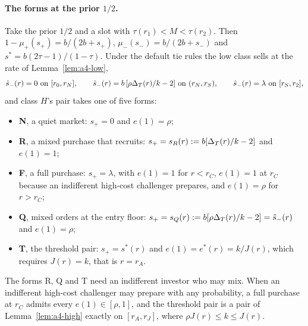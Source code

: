 \paragraph{The forms at the prior \(1/2\).}
Take the prior \(1/2\) and a slot with \(\tau(r_1)<M<\tau(r_2)\). Then \(1-\mu_+(s_+)=b/(2b+s_+)\),
\(\mu_-(s_-)=b/(2b+s_-)\) and \(s^*=b(2\tau-1)/(1-\tau)\). Under the default tie rules the low class sells at the rate
of Lemma~\ref{lem:a4-low},
\[
\hat s_-(r)=0\ \text{on}\ [r_0,r_N],\qquad \hat s_-(r)=b\,[\rho\Delta_T(r)/k-2]\ \text{on}\ (r_N,r_S),\qquad
\hat s_-(r)=\lambda\ \text{on}\ [r_S,r_2],
\]
and class \(H\)'s pair takes one of five forms:
\begin{itemize}[leftmargin=2em]
\item \textbf{N}, a quiet market: \(s_+=0\) and \(e(1)=\rho\);
\item \textbf{R}, a mixed purchase that recruits: \(s_+=s_R(r):=b[\Delta_T(r)/k-2]\) and \(e(1)=1\);
\item \textbf{F}, a full purchase: \(s_+=\lambda\), with \(e(1)=1\) for \(r<r_C\), \(e(1)=1\) at \(r_C\) because an
indifferent high-cost challenger prepares, and \(e(1)=\rho\) for \(r>r_C\);
\item \textbf{Q}, mixed orders at the entry floor: \(s_+=s_Q(r):=b[\rho\Delta_T(r)/k-2]=\hat s_-(r)\) and \(e(1)=\rho\);
\item \textbf{T}, the threshold pair: \(s_+=s^*(r)\) and \(e(1)=e^*(r)=k/J(r)\), which requires \(J(r)=k\), that is
\(r=r_A\).
\end{itemize}
The forms R, Q and T need an indifferent investor who may mix. When an indifferent high-cost challenger may prepare
with any probability, a full purchase at \(r_C\) admits every \(e(1)\in[\rho,1]\), and the threshold pair is a pair of
Lemma~\ref{lem:a4-high} exactly on \([r_A,r_J]\), where \(\rho J(r)\le k\le J(r)\).

